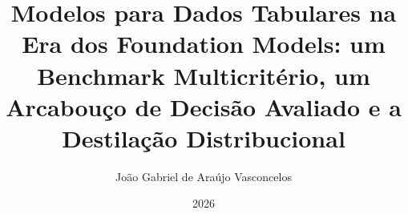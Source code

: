 \documentclass[pt,oneside,onehalfspacing,msc]{risethesis}
\title{Modelos para Dados Tabulares na Era dos Foundation Models:
um Benchmark Multicritério, um Arcabouço de Decisão Avaliado e a
Destilação Distribucional}
\date{2026}
\author{João Gabriel de Araújo Vasconcelos}
\begin{document}
\frontpage
\presentationpage

\begin{fichacatalografica}
\end{fichacatalografica}


\acknowledgements


\resumo


\abstract




\listoffigures
\listoftables

\tableofcontents
\clearpage
\pagestyle{fancy}










\cleardoublepage
{}



\theappendix



\end{document}
